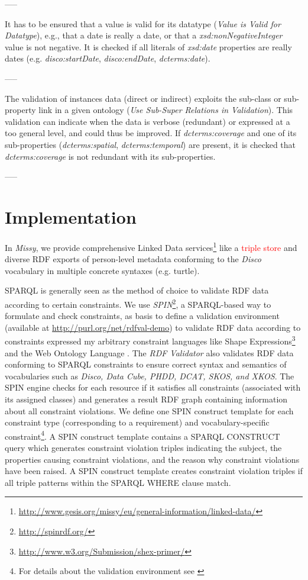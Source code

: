 \documentclass{llncs}
\begin{document}
{{-----

It has to be ensured that a value is valid for its datatype (\emph{Value is Valid for Datatype}), e.g., 
that a date is really a date, or that a \emph{xsd:nonNegativeInteger} value is not negative. 
It is checked if all literals of {\em xsd:date} properties are really dates (e.g. {\em disco:startDate}, {\em disco:endDate}, {\em dcterms:date}).

-----

The validation of instances data (direct or indirect) exploits the sub-class or sub-property link in a given ontology (\emph{Use Sub-Super Relations in Validation}).
This validation can indicate when the data is verbose (redundant) or expressed at a too general level, and could thus be improved.
If \emph{dcterms:coverage} and one of its sub-properties (\emph{dcterms:spatial}, \emph{dcterms:temporal}) are present,
it is checked that \emph{dcterms:coverage} is not redundant with its sub-properties. 

-----

\section{Implementation}

In \emph{Missy}, we provide comprehensive Linked Data services\footnote{\textcolor{red}{\url{http://www.gesis.org/missy/eu/general-information/linked-data/}}} like a \textcolor{red}{triple store} and diverse RDF exports of person-level metadata conforming to the \emph{Disco} vocabulary in multiple concrete syntaxes (e.g. turtle). 

SPARQL is generally seen as the method of choice to validate RDF data according to certain constraints.
We use \emph{SPIN}\footnote{\url{http://spinrdf.org/}}, 
a SPARQL-based way to formulate and check constraints, as basis to define a
validation environment (available at \url{http://purl.org/net/rdfval-demo}) to validate RDF data according to constraints expressed my arbitrary constraint languages like Shape Expressions\footnote{\url{http://www.w3.org/Submission/shex-primer/}} and the Web Ontology Language \cite{BoschEckert2014-2}.
The \emph{RDF Validator} also validates RDF data conforming to SPARQL constraints to ensure correct syntax and semantics of vocabularies such as \emph{Disco, Data Cube, PHDD, DCAT, SKOS, and XKOS}.
The SPIN engine checks for each resource if it satisfies all constraints (associated with its assigned classes) and generates a result RDF graph containing information about all constraint violations.
We define one SPIN construct template for each constraint type (corresponding to a requirement) and vocabulary-specific constraint\footnote{For details about the validation environment see \cite{BoschEckert2014-2}}.
A SPIN construct template contains a SPARQL CONSTRUCT query which generates constraint violation triples indicating the subject, the properties causing constraint violations, and the reason why constraint violations have been raised.
A SPIN construct template creates constraint violation triples if all triple patterns within the SPARQL WHERE clause match.

}}
\end{document}
